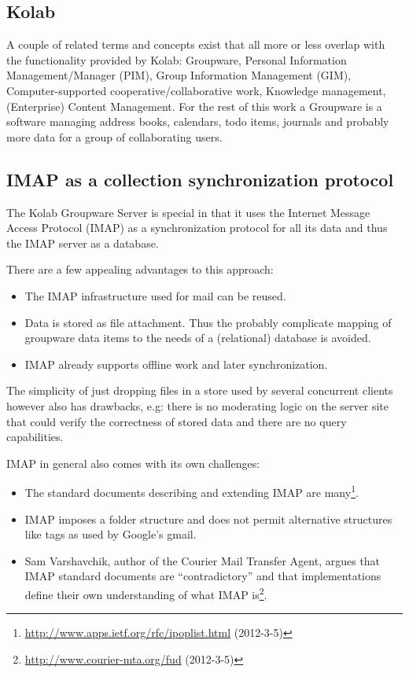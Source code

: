 \documentclass[12pt,a4paper,twoside]{scrartcl}		%
\newcommand{\citeurl}[2]{\url{#1} (#2)}
\begin{document}

\subsection{Kolab}
\label{sec:kolab}


A couple of related terms and concepts exist that all more or less overlap with
the functionality provided by Kolab: Groupware, Personal Information
Management/Manager (PIM), Group Information Management (GIM), Computer-supported
cooperative/collaborative work, Knowledge management, (Enterprise) Content
Management. For the rest of this work a Groupware is a software managing address
books, calendars, todo items, journals and probably more data for a group of
collaborating users.


\subsection{IMAP as a collection synchronization protocol}

The Kolab Groupware Server is special in that it uses the Internet Message
Access Protocol (IMAP) as a synchronization protocol for all its data and thus
the IMAP server as a database.

There are a few appealing advantages to this approach:

\begin{itemize}
  \item The IMAP infrastructure used for mail can be reused.
  \item Data is stored as file attachment. Thus the probably complicate mapping of
  groupware data items to the needs of a (relational) database is avoided.
  \item IMAP already supports offline work and later synchronization.
\end{itemize}

The simplicity of just dropping files in a store used by several concurrent
clients however also has drawbacks, e.g: there is no moderating logic on the
server site that could verify the correctness of stored data and there are no
query capabilities.

IMAP in general also comes with its own challenges:

\begin{itemize}
\item The standard documents describing and extending IMAP are
  many\footnote{\citeurl{http://www.apps.ietf.org/rfc/ipoplist.html}{2012-3-5}}.
\item IMAP imposes a folder structure and does not permit alternative structures
  like tags as used by Google's gmail.
\item Sam Varshavchik, author of the Courier Mail Transfer Agent, argues that
  IMAP standard documents are ``contradictory'' and that implementations define
  their own understanding of what IMAP
  is\footnote{\citeurl{http://www.courier-mta.org/fud}{2012-3-5}}.
\end{itemize}
\end{document}
